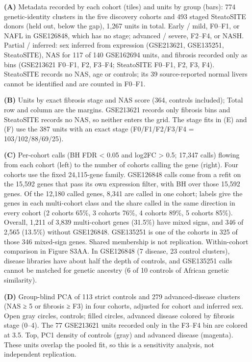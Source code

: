 \textbf{(A)} Metadata recorded by each cohort (tiles) and units by group (bars): 774 genetic-identity clusters in the five discovery cohorts and 493 staged SteatoSITE donors (held out, below the gap), 1,267 units in total. Early / mild, F0--F1, or NAFL in GSE126848, which has no stage; advanced / severe, F2--F4, or NASH. Partial / inferred: sex inferred from expression (GSE213621, GSE135251, SteatoSITE), NAS for 117 of 140 GSE162694 units, and fibrosis recorded only as bins (GSE213621 F0--F1, F2, F3--F4; SteatoSITE F0--F1, F2, F3, F4). SteatoSITE records no NAS, age or controls; its 39 source-reported normal livers cannot be identified and are counted in F0--F1.

\textbf{(B)} Units by exact fibrosis stage and NAS score (364, controls included); Total row and column are the margins. GSE213621 records only fibrosis bins and SteatoSITE records no NAS, so neither enters the grid. The stage fits in (E) and (F) use the 387 units with an exact stage (F0/F1/F2/F3/F4 = 103/102/88/69/25).

\textbf{(C)} Per-cohort calls (BH FDR \textless{} 0.05 and \textbar log2FC\textbar{} \textgreater{} 0.5; 17,347 calls) flowing from each cohort (left) to the number of cohorts calling the gene (right). Four cohorts use the fixed 24,115-gene family. GSE126848 calls come from a refit on the 15,592 genes that pass its own expression filter, with BH over those 15,592 genes. Of the 12,180 called genes, 8,341 are called in one cohort; labels give the genes in each multi-cohort class and the share called in the same direction in every cohort (2 cohorts 65\%, 3 cohorts 76\%, 4 cohorts 89\%, 5 cohorts 85\%). Overall, 1,211 of 3,839 multi-cohort genes (31.5\%) have mixed signs, and 346 of 2,565 (13.5\%) without GSE126848. GSE135251 is one of the cohorts in 325 of those 346 mixed-sign genes. Shared membership is not replication. Within-cohort comparison in Figure S3AA. In GSE126848 (7 disease, 23 control clusters), disease libraries have about half the depth of controls, and GSE135251 calls cannot be matched for genetic ancestry (6 of 10 controls of African genetic similarity).

\textbf{(D)} Group-blind PCA of 113 strict controls and 279 advanced-disease clusters (NAS ≥ 5 or fibrosis ≥ F3) in four cohorts, adjusted for cohort and inferred sex. Open gray circles, controls; filled circles, advanced disease colored by fibrosis stage (0--4). The 77 GSE213621 units recorded only in the F3--F4 bin are colored at 3.5. Top, PC1 density of controls (gray) and advanced disease (magenta). These units overlap the pooled fit, so this is a sensitivity analysis, not independent replication.

